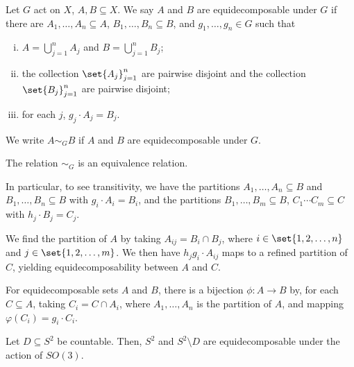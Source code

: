 \documentclass[12pt]{mypackage}
\begin{document}
\begin{definition}
  Let $G$ act on $X$, $A,B\subseteq X$. We say $A$ and $B$ are equidecomposable under $G$ if there are $A_1,\dots,A_n\subseteq A$, $B_1,\dots,B_n\subseteq B$, and $g_1,\dots,g_n\in G$ such that
  \begin{enumerate}[(i)]
    \item $A = \bigcup_{j=1}^{n}A_j$ and $B = \bigcup_{j=1}^{n}B_j$;
    \item the collection $\set{A_j}_{j=1}^{n}$ are pairwise disjoint and the collection $\set{B_j}_{j=1}^{n}$ are pairwise disjoint;
    \item for each $j$, $g_j\cdot A_j = B_j$.
  \end{enumerate}
  We write $A\sim_{G} B$ if $A$ and $B$ are equidecomposable under $G$.
\end{definition}
\begin{remark}
  The relation $\sim_{G}$ is an equivalence relation.\newline

  In particular, to see transitivity, we have the partitions $A_1,\dots,A_n\subseteq B$ and $B_1,\dots,B_n\subseteq B$ with $g_i\cdot A_i = B_i$, and the partitions $B_1,\dots,B_m\subseteq B$, $C_1\cdots C_m\subseteq C$ with $h_j\cdot B_j = C_j$.\newline

  We find the partition of $A$ by taking $A_{ij} = B_i\cap B_j$, where $i\in \set{1,2,\dots,n}$ and $j\in \set{1,2,\dots,m}$. We then have $h_jg_i\cdot A_{ij}$ maps to a refined partition of $C$, yielding equidecomposability between $A$ and $C$.
\end{remark}
\begin{remark}
  For equidecomposable sets $A$ and $B$, there is a bijection $\phi: A\rightarrow B$ by, for each $C\subseteq A$, taking $C_{i} = C\cap A_i$, where $A_1,\dots,A_n$ is the partition of $A$, and mapping $\varphi\left(C_i\right) = g_i\cdot C_i$.
\end{remark}
\begin{proposition}
  Let $D\subseteq S^2$ be countable. Then, $S^2$ and $S^{2}\setminus D$ are equidecomposable under the action of $SO(3)$.
\end{proposition}
\end{document}
